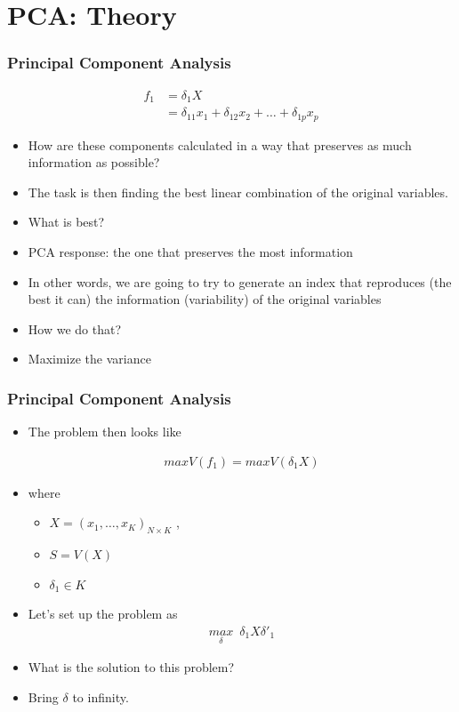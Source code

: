 \documentclass[
  shownotes,
  xcolor={svgnames},
  hyperref={colorlinks,citecolor=DarkBlue,linkcolor=DarkRed,urlcolor=DarkBlue}
  , aspectratio=169]{beamer}
\begin{document}
\section{PCA: Theory}
\begin{frame}
\frametitle{Principal Component Analysis}

\begin{align}
f_1 &= \delta_1 X \\
    &= \delta_{11} x_1+ \delta_{12} x_2 + \dots + \delta_{1p} x_p
\end{align}


\begin{itemize}
  \item How are these components calculated in a way that preserves as much information as possible?
  \medskip
  \item The task is then finding the best linear combination of the original variables.
  \medskip
  \item What is best?
  \medskip
  \pause
  \item PCA response: the one that preserves the most information
  \medskip
  \item In other words, we are going to try to generate an index that reproduces (the best it can) the information (variability) of the original variables
  \medskip
  \item How we do that?
  \pause
  \medskip
  \item Maximize the variance

\end{itemize}   
\end{frame}
\begin{frame}
\frametitle{Principal Component Analysis}

\begin{itemize}
  \item The problem then looks like

  \begin{align}
  max V(f_1) = max V(\delta_1 X)
  \end{align}

  \item where
  \begin{itemize}
    \item $X = (x_1 , \dots , x_K)_{N \times K}$  , 
    \item $S = V(X)$ 
    \item $\delta_1 \in K$
 \end{itemize}
  \item Let's set up the problem as 
  \begin{align}
  \underset{\delta}{max}\,\,\, \delta_1 X \delta'_1
  \end{align}

  \item What is the solution to this problem?

 \pause
  \item Bring $\delta$ to infinity. 
 
\end{itemize}
 \end{frame}
\end{document}

